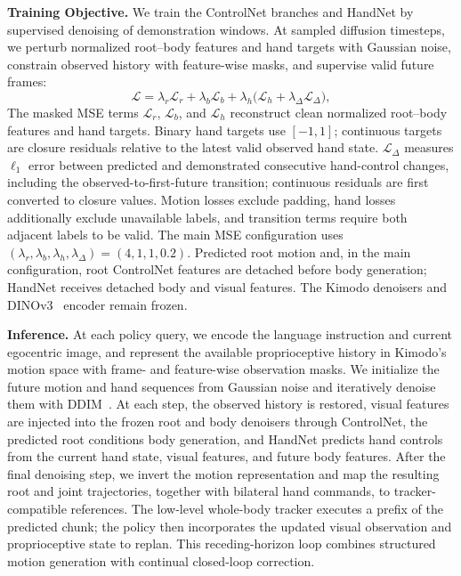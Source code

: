 \textbf{Training Objective.} We train the ControlNet branches and HandNet by supervised denoising of demonstration windows. At sampled diffusion timesteps, we perturb normalized root--body features and hand targets with Gaussian noise, constrain observed history with feature-wise masks, and supervise valid future frames:
\begin{equation}
  \mathcal{L}=\lambda_r\mathcal{L}_{r}+\lambda_b\mathcal{L}_{b}
  +\lambda_h\bigl(\mathcal{L}_{h}+\lambda_{\Delta}\mathcal{L}_{\Delta}\bigr),
  \label{eq:policy_training_objective}
\end{equation}
The masked MSE terms $\mathcal{L}_{r}$, $\mathcal{L}_{b}$, and $\mathcal{L}_{h}$ reconstruct clean normalized root--body features and hand targets. Binary hand targets use $[-1,1]$; continuous targets are closure residuals relative to the latest valid observed hand state. $\mathcal{L}_{\Delta}$ measures $\ell_1$ error between predicted and demonstrated consecutive hand-control changes, including the observed-to-first-future transition; continuous residuals are first converted to closure values. Motion losses exclude padding, hand losses additionally exclude unavailable labels, and transition terms require both adjacent labels to be valid. The main MSE configuration uses $(\lambda_r,\lambda_b,\lambda_h,\lambda_{\Delta})=(4,1,1,0.2)$. Predicted root motion and, in the main configuration, root ControlNet features are detached before body generation; HandNet receives detached body and visual features. The Kimodo denoisers and DINOv3~\cite{dinov3} encoder remain frozen.

\textbf{Inference.} At each policy query, we encode the language instruction and current egocentric image, and represent the available proprioceptive history in Kimodo's motion space with frame- and feature-wise observation masks. We initialize the future motion and hand sequences from Gaussian noise and iteratively denoise them with DDIM~\cite{song2022denoisingdiffusionimplicitmodels}. At each step, the observed history is restored, visual features are injected into the frozen root and body denoisers through ControlNet, the predicted root conditions body generation, and HandNet predicts hand controls from the current hand state, visual features, and future body features. After the final denoising step, we invert the motion representation and map the resulting root and joint trajectories, together with bilateral hand commands, to tracker-compatible references. The low-level whole-body tracker executes a prefix of the predicted chunk; the policy then incorporates the updated visual observation and proprioceptive state to replan. This receding-horizon loop combines structured motion generation with continual closed-loop correction.

